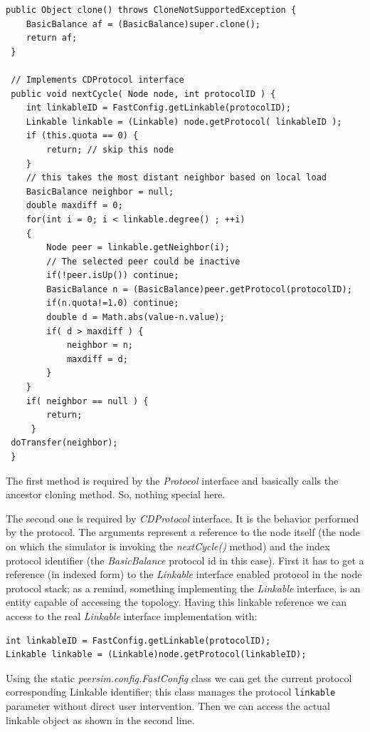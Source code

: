 \documentclass[a4paper,11pt]{article}
\begin{document}
\footnotesize
\begin{verbatim}
public Object clone() throws CloneNotSupportedException {
 	BasicBalance af = (BasicBalance)super.clone();
 	return af;
 }

 // Implements CDProtocol interface
 public void nextCycle( Node node, int protocolID ) {
 	int linkableID = FastConfig.getLinkable(protocolID);
 	Linkable linkable = (Linkable) node.getProtocol( linkableID );
	if (this.quota == 0) {
 		return; // skip this node
 	} 
 	// this takes the most distant neighbor based on local load
 	BasicBalance neighbor = null;
 	double maxdiff = 0;
 	for(int i = 0; i < linkable.degree() ; ++i)
 	{
 		Node peer = linkable.getNeighbor(i);
 		// The selected peer could be inactive
 		if(!peer.isUp()) continue; 
 		BasicBalance n = (BasicBalance)peer.getProtocol(protocolID);
 		if(n.quota!=1.0) continue;
 		double d = Math.abs(value-n.value);
 		if( d > maxdiff ) {
			neighbor = n;
			maxdiff = d;
		}
	}
 	if( neighbor == null ) {
 		return;
	 }
 doTransfer(neighbor);
 }
\end{verbatim}
\normalsize


The first method is required by the \emph{Protocol} interface and basically
calls the ancestor cloning method. So, nothing special here.

The second one is required by \emph{CDProtocol} interface. It is the
behavior performed by the protocol. The arguments represent a reference
to the node itself (the node on which the simulator is invoking the
\emph{nextCycle()} method) and the index protocol identifier (the \emph{BasicBalance}
protocol id in this case). First it has to get a reference (in indexed form) to
the \emph{Linkable} interface enabled protocol in the node protocol
stack; as a remind, something implementing the \emph{Linkable} interface,
is an entity capable of accessing the topology. Having this linkable
reference we can access to the real \emph{Linkable} interface
implementation with: 

\begin{verbatim}
int linkableID = FastConfig.getLinkable(protocolID);
Linkable linkable = (Linkable)node.getProtocol(linkableID);
\end{verbatim}


Using the static \emph{peersim.config.FastConfig} class we can get the
current protocol corresponding Linkable identifier; this class manages
the protocol \texttt{linkable} parameter without direct user
intervention. Then we can access the actual linkable object as shown
in the second line.
\end{document}
